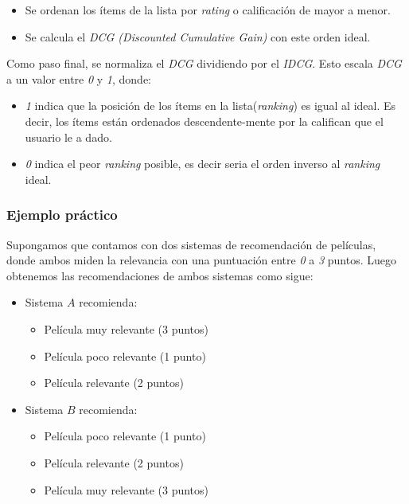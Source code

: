 \documentclass[11pt,a4paper,twoside]{thesis}
\begin{document}
\begin{itemize}
	\item Se ordenan los ítems de la lista por \textit{rating} o calificación de mayor a menor.
	\item Se calcula el \textit{DCG (Discounted Cumulative Gain)} con este orden ideal.
\end{itemize}

Como paso final, se normaliza el \textit{DCG} dividiendo por el \textit{IDCG}. Esto escala \textit{DCG} a un valor entre \textit{0} y \textit{1}, donde:

\begin{itemize}
	\item \textit{1} indica que la posición de los ítems en la lista(\textit{ranking}) es igual al ideal. Es decir, los ítems están ordenados descendente-mente por la califican que el usuario le a dado.
	\item \textit{0} indica el peor \textit{ranking} posible, es decir seria el orden inverso al \textit{ranking} ideal.
\end{itemize}

\subsubsection{Ejemplo práctico}

Supongamos que contamos con dos sistemas de recomendación de películas, donde ambos miden la relevancia con una puntuación entre \textit{0} a \textit{3} puntos. Luego obtenemos las recomendaciones de ambos sistemas como sigue:

\begin{itemize}
	\item Sistema $A$ recomienda:
	      \begin{itemize}
		      \item Película muy relevante (3 puntos)
		      \item Película poco relevante (1 punto)
		      \item Película relevante (2 puntos)
	      \end{itemize}

	\item Sistema $B$ recomienda:
	      \begin{itemize}
		      \item Película poco relevante (1 punto)
		      \item Película relevante (2 puntos)
		      \item  Película muy relevante (3 puntos)
	      \end{itemize}
\end{itemize}
\end{document}
